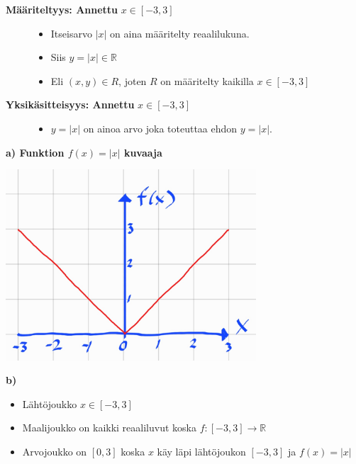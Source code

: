 \documentclass{article}
\begin{document}
        \begin{description}
            \item[{\textbf{Määriteltyys: Annettu} $x \in [-3, 3]$}]\quad
            \begin{itemize}
                \item Itseisarvo $|x|$ on aina määritelty reaalilukuna.
                \item Siis $y = |x| \in \mathbb{R}$
                \item Eli $(x, y) \in R$, joten $R$ on määritelty kaikilla $x \in [-3, 3]$
            \end{itemize}
            \item[{\textbf{Yksikäsitteisyys: Annettu} $x \in [-3, 3]$}]\quad
            \begin{itemize}
                \item $y = |x|$ on ainoa arvo joka toteuttaa ehdon $y = |x|$.
            \end{itemize}            
        \end{description}
        \linebreak
        \linebreak
        \textbf{a) Funktion $f(x) = |x|$ kuvaaja}
        \begin{center}
            \includegraphics[width=0.7\textwidth]{image.png}
        \end{center}

        \textbf{b)}
        \begin{itemize}
            \item Lähtöjoukko $x \in [-3, 3]$
            \item Maalijoukko on kaikki reaaliluvut koska $f: [-3, 3] \to \mathbb{R}$
            \item Arvojoukko on $[0, 3]$ koska $x$ käy läpi lähtöjoukon $[-3, 3]$ ja $f(x) = |x|$ 
        \end{itemize}
\pagebreak
\end{document}
